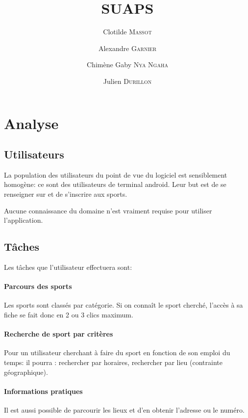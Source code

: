 \documentclass{article}
\title{SUAPS}
\author{Clotilde \textsc{Massot} \and Alexandre \textsc{Garnier} \and Chimène Gaby \textsc{Nya Ngaha} \and Julien \textsc{Durillon}}
\begin{document}
\maketitle

\section{Analyse}

	\subsection{Utilisateurs}
		La population des utilisateurs du point de vue du logiciel est
		sensiblement homogène: ce sont des utilisateurs de terminal android.
		Leur but est de se renseigner sur et de s'inscrire aux sports.

		Aucune connaissance du domaine n'est vraiment requise pour utiliser
		l'application.

	\subsection{Tâches}

	 Les tâches que l'utilisateur effectuera sont:

	    \paragraph{Parcours des sports}

	        Les sports sont classés par catégorie. Si on connaît le sport
	        cherché, l'accès à sa fiche se fait donc en 2 ou 3 \og clics\fg{}
	        maximum.

        \paragraph{Recherche de sport par critères}

            Pour un utilisateur cherchant à faire du sport en fonction de son
            emploi du temps: il pourra : rechercher par horaires, rechercher par
            lieu (contrainte géographique).

        \paragraph{Informations pratiques}

            Il est aussi possible de parcourir les lieux et d'en obtenir
            l'adresse ou le numéro.
\end{document}
